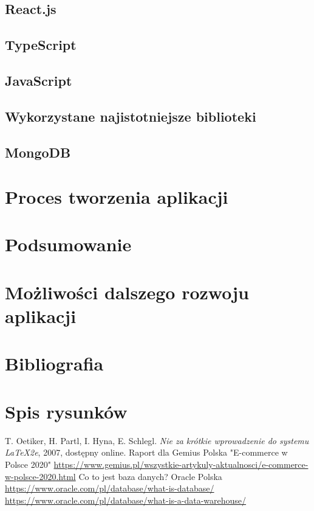 \documentclass[12pt]{article}
\begin{document}
\begin{sloppypar}
{{}
\subsection{React.js}
{

}
\subsection{TypeScript}
{

}
\subsection{JavaScript}
{

}
\subsection{Wykorzystane najistotniejsze biblioteki}
{

}
\subsection{MongoDB}
{

}
}

\section{Proces tworzenia aplikacji}
{

}

\section{Podsumowanie}
{

}

\section{Możliwości dalszego rozwoju aplikacji}
{

}

\section{Bibliografia}
{

}

\section{Spis rysunków}
{

}

\begin{thebibliography}{0}
   T. Oetiker, H. Partl, I. Hyna, E. Schlegl.
    \textsl{Nie za krótkie wprowadzenie do systemu \LaTeX2e}, 2007, dostępny
    online.
   Raport dla Gemius Polska "E-commerce w Polsce 2020"
    \url{https://www.gemius.pl/wszystkie-artykuly-aktualnosci/e-commerce-w-polsce-2020.html}
   Co to jest baza danych? Oracle Polska
    \url{https://www.oracle.com/pl/database/what-is-database/}
   \url{https://www.oracle.com/pl/database/what-is-a-data-warehouse/}
\end{thebibliography}

\end{sloppypar}
\end{document}
